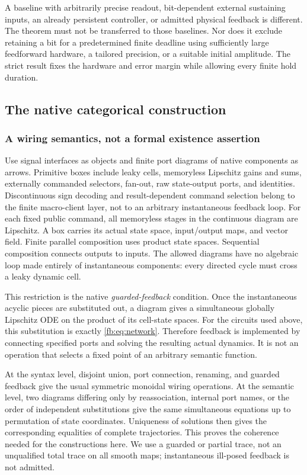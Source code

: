 \documentclass[11pt]{article}
\theoremstyle{definition}
\theoremstyle{remark}
\begin{document}
A baseline with arbitrarily precise readout, bit-dependent external sustaining inputs, an already persistent controller, or admitted physical feedback is different. The theorem must not be transferred to those baselines. Nor does it exclude retaining a bit for a predetermined finite deadline using sufficiently large feedforward hardware, a tailored precision, or a suitable initial amplitude. The strict result fixes the hardware and error margin while allowing every finite hold duration.

\subsection{The native categorical construction}
\subsubsection{A wiring semantics, not a formal existence assertion}
Use signal interfaces as objects and finite port diagrams of native components as arrows. Primitive boxes include leaky cells, memoryless Lipschitz gains and sums, externally commanded selectors, fan-out, raw state-output ports, and identities. Discontinuous sign decoding and result-dependent command selection belong to the finite macro-client layer, not to an arbitrary instantaneous feedback loop. For each fixed public command, all memoryless stages in the continuous diagram are Lipschitz. A box carries its actual state space, input/output maps, and vector field. Finite parallel composition uses product state spaces. Sequential composition connects outputs to inputs. The allowed diagrams have no algebraic loop made entirely of instantaneous components: every directed cycle must cross a leaky dynamic cell.

This restriction is the native \emph{guarded-feedback} condition. Once the instantaneous acyclic pieces are substituted out, a diagram gives a simultaneous globally Lipschitz ODE on the product of its cell-state spaces. For the circuits used above, this substitution is exactly \eqref{fb:eq:network}. Therefore feedback is implemented by connecting specified ports and solving the resulting actual dynamics. It is not an operation that selects a fixed point of an arbitrary semantic function.

At the syntax level, disjoint union, port connection, renaming, and guarded feedback give the usual symmetric monoidal wiring operations. At the semantic level, two diagrams differing only by reassociation, internal port names, or the order of independent substitutions give the same simultaneous equations up to permutation of state coordinates. Uniqueness of solutions then gives the corresponding equalities of complete trajectories. This proves the coherence needed for the constructions here. We use a guarded or partial trace, not an unqualified total trace on all smooth maps; instantaneous ill-posed feedback is not admitted.
\end{document}
